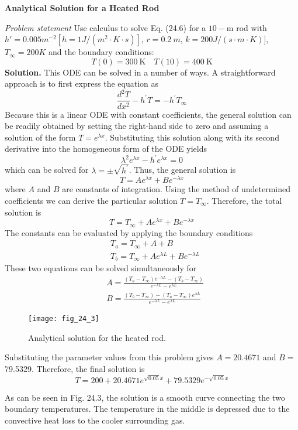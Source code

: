 \documentclass[../main.tex]{subfiles}
\begin{document}
\begin{exmp}
    \textbf{Analytical Solution for a Heated Rod}

    \noindent \textit{Problem statement} Use calculus to solve Eq. (24.6) for a $10-\mathrm{m}$ rod with $h'= 0.005m^{-2}[h=1 J/(m^2\cdot K\cdot s)]$, $r=0.2\ m$, $k=200J/(s\cdot m\cdot K)]$, $T_\infty=200K$ and the boundary conditions:
    $$
    T(0)=300 \mathrm{~K} \quad T(10)=400 \mathrm{~K}
    $$
    \textbf{Solution.} This ODE can be solved in a number of ways. A straightforward approach is to first express the equation as
    $$
    \frac{d^{2} T}{d x^{2}}-h^{\prime} T=-h^{\prime} T_{\infty}
    $$
    Because this is a linear ODE with constant coefficients, the general solution can be readily obtained by setting the right-hand side to zero and assuming a solution of the form $T=e^{\lambda x}$. Substituting this solution along with its second derivative into the homogeneous form of the ODE yields
    $$
    \lambda^{2} e^{\lambda x}-h^{\prime} e^{\lambda x}=0
    $$
    which can be solved for $\lambda=\pm \sqrt{h^{\prime}}$. Thus, the general solution is
    $$
    T=A e^{\lambda x}+B e^{-\lambda x}
    $$
    where $A$ and $B$ are constants of integration. Using the method of undetermined coefficients we can derive the particular solution $T=T_{\infty}$. Therefore, the total solution is
    $$
    T=T_{\infty}+A e^{\lambda x}+B e^{-\lambda x}
    $$
    The constants can be evaluated by applying the boundary conditions
    $$
    \begin{aligned}
    &T_{a}=T_{\infty}+A+B \\
    &T_{b}=T_{\infty}+A e^{\lambda L}+B e^{-\lambda L}
    \end{aligned}
    $$
    These two equations can be solved simultaneously for
    $$
    \begin{aligned}
    &A=\frac{\left(T_{a}-T_{\infty}\right) e^{-\lambda L}-\left(T_{b}-T_{\infty}\right)}{e^{-\lambda L}-e^{\lambda L}} \\
    &B=\frac{\left(T_{b}-T_{\infty}\right)-\left(T_{a}-T_{\infty}\right) e^{\lambda L}}{e^{-\lambda L}-e^{\lambda L}}
    \end{aligned}
    $$

    \begin{figure}[H]
        \centering
        \texttt{[image: fig\_24\_3]}
       \caption{\textsf{Analytical solution for the heated rod.}}\label{fig:fig_24_3}
    \end{figure}

    \noindent Substituting the parameter values from this problem gives $A=20.4671$ and $B=$ 79.5329. Therefore, the final solution is
    \begin{equation}
        \tag{24.7}
        T=200+20.4671 e^{\sqrt{0.05} x}+79.5329 e^{-\sqrt{0.05} x}
    \end{equation}
    
    As can be seen in Fig. 24.3, the solution is a smooth curve connecting the two boundary temperatures. The temperature in the middle is depressed due to the convective heat loss to the cooler surrounding gas.
\end{exmp}\vspace{5mm}
\end{document}
